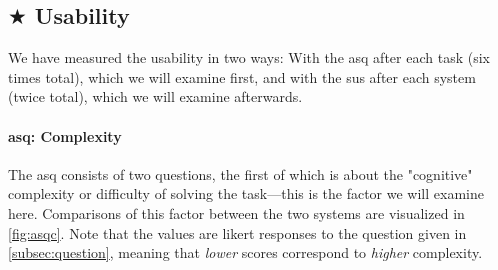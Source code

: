 \documentclass[../thesis]{subfiles}
\begin{document}
\subsection{$\bigstar$ Usability}
We have measured the usability in two ways:
With the \gls{asq} after each task (six times total), which we will examine first, and with the \gls{sus} after each system (twice total), which we will examine afterwards.

\paragraph{\gls{asq}: Complexity}
The \gls{asq} consists of two questions, the first of which is about the "cognitive" complexity or difficulty of solving the task---this is the factor we will examine here.
Comparisons of this factor between the two systems are visualized in \cref{fig:asqc}.
Note that the values are \gls{likert} responses to the question given in \cref{subsec:question}, meaning that \emph{lower} scores correspond to \emph{higher} complexity.
\end{document}
